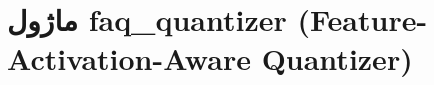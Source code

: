 \section{ماژول faq\_quantizer (Feature-Activation-Aware Quantizer)}
\label{sec:module_faq_quantizer}

